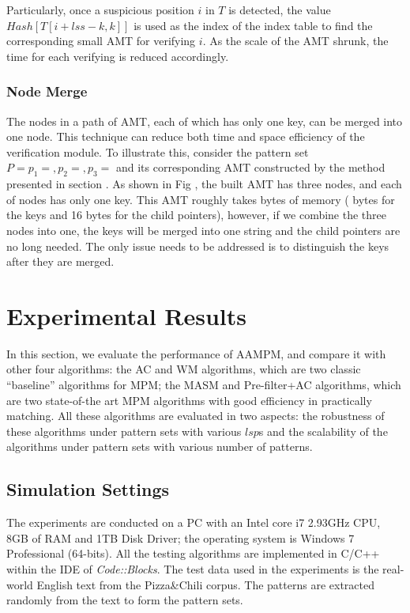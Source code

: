 \documentclass{article}
\begin{document}
Particularly, once a suspicious position $i$ in $T$ is detected, the
value $Hash[T[i+lss-k,k]]$ is used as the index of the index table to
find the corresponding small AMT for verifying $i$. As the scale of
the AMT shrunk, the time for each verifying is reduced accordingly.

\subsubsection{Node Merge}
\label{sec:node merge}

The nodes in a path of AMT, each of which has only one key, can be
merged into one node. This technique can reduce both time and space
efficiency of the verification module. To illustrate this, consider
the pattern set $P={p_1=, p_2=,p_3=}$ and its corresponding AMT
constructed by the method presented in section . As shown in Fig , the
built AMT has three nodes, and each of nodes has only one key. This
AMT roughly takes bytes of memory ( bytes for the keys and 16 bytes
for the child pointers), however, if we combine the three nodes into
one, the keys will be merged into one string and the child pointers
are no long needed. The only issue needs to be addressed is to
distinguish the keys after they are merged.

\section{Experimental Results}
\label{sec:experiments}

In this section, we evaluate the performance of \textsf{AAMPM}, and
compare it with other four algorithms: the \textsf{AC} and \textsf{WM}
algorithms, which are two classic ``baseline'' algorithms for MPM; the
\textsf{MASM} and \textsf{Pre-filter+AC} algorithms, which are two
state-of-the art MPM algorithms with good efficiency in practically
matching. All these algorithms are evaluated in two aspects: the
robustness of these algorithms under pattern sets with various $lsp$s
and the scalability of the algorithms under pattern sets with various
number of patterns.

\subsection{Simulation Settings}

The experiments are conducted on a PC with an Intel core i7 2.93GHz
CPU, 8GB of RAM and 1TB Disk Driver; the operating system is Windows 7
Professional (64-bits). All the testing algorithms are implemented in
C/C++ within the IDE of \emph{Code::Blocks}. The test data used in the
experiments is the real-world English text from the Pizza\;\&\;Chili
corpus. The patterns are extracted randomly from the text to form the
pattern sets.
\end{document}
